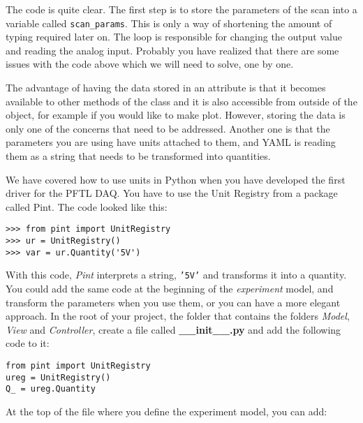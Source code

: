 The code is quite clear. The first step is to store the parameters of the scan into a variable called \texttt{scan_params}. This is only a way of shortening the amount of typing required later on. The loop is responsible for changing the output value and reading the analog input. Probably you have realized that there are some issues with the code above which we will need to solve, one by one.


The advantage of having the data stored in an attribute is that it becomes available to other methods of the class and it is also accessible from outside of the object, for example if you would like to make plot. However, storing the data is only one of the concerns that need to be addressed. Another one is that the parameters you are using have units attached to them, and YAML is reading them as a string that needs to be transformed into quantities. 

We have covered how to use units in Python when you have developed the first driver for the {PFTL} {DAQ}. You have to use the Unit Registry from a package called Pint. The code looked like this:

\begin{verbatim}
>>> from pint import UnitRegistry
>>> ur = UnitRegistry()
>>> var = ur.Quantity('5V')
\end{verbatim}

With this code, \emph{Pint} interprets a string, \texttt{'5V'} and transforms it into a quantity. You could add the same code at the beginning of the \emph{experiment} model, and transform the parameters when you use them, or you can have a more elegant approach. In the root of your project, the folder that contains the folders \emph{Model}, \emph{View} and \emph{Controller}, create a file called \textbf{\_\_init\_\_.py} and add the following code to it:

\begin{verbatim}
from pint import UnitRegistry
ureg = UnitRegistry()
Q_ = ureg.Quantity
\end{verbatim}

At the top of the file where you define the experiment model, you can add:


